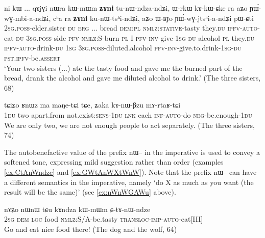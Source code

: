 \documentclass[oldfontcommands,oneside,a4paper,11pt]{article}
\newcommand{\ipa}[1]{{\phon \mbox{#1}}} %
\begin{document}
   \begin{exe}
\ex \label{ex:tunWndzandZi}
\gll  \ipa{nɤ-pi}   	\ipa{ni}   	\ipa{kɯ}   	...   	\ipa{qɤjɣi}   	\ipa{nɯra}   	\ipa{kɯ-mɯm}   	\textbf{\ipa{ʑɤni}}   	\ipa{tu-nɯ-ndza-ndʑi,}   	\ipa{ɯ-rkɯ}   	\ipa{kɤ-kɯ-ɕke}   	\ipa{ra}   	\ipa{aʑo}   	\ipa{ɲɯ́-wɣ-mbi-a-ndʑi,}   	\ipa{cʰa}   	\ipa{ra}   	\textbf{\ipa{ʑɤni}}   	\ipa{ku-nɯ-tsʰi-ndʑi,}   	\ipa{aʑo}   	\ipa{ɯ-ʁɟo}   	\ipa{ɲɯ́-wɣ-jtsʰi-a-ndʑi}   	\ipa{pɯ-ɕti}        \\
\textsc{2sg.poss}-elder.sister \textsc{du} \textsc{erg} ... bread \textsc{dem:pl} \textsc{nmlz:stative}-tasty they.\textsc{du} \textsc{ipfv}-\textsc{auto}-eat-\textsc{du} \textsc{3sg.poss}-side \textsc{pfv}-\textsc{nmlz:S}-burn \textsc{pl}  I \textsc{pfv}-\textsc{inv}-give-\textsc{1sg}-\textsc{du} alcohol \textsc{pl} they.\textsc{du} \textsc{ipfv}-\textsc{auto}-drink-\textsc{du} \textsc{1sg} \textsc{3sg.poss}-diluted.alcohol \textsc{pfv}-\textsc{inv}-give.to.drink-\textsc{1sg}-\textsc{du} \textsc{pst.ipfv}-be.\textsc{assert}  \\
 \glt    `Your two sisters (...) ate the tasty food and gave me the burned part of the bread, drank the alcohol and gave me diluted alcohol to drink.'  (The three sisters, 68)
\end{exe} 



   \begin{exe}
\ex \label{ex:kAnWBzu.mArtaRtCi}
\gll
\ipa{tɕiʑo} 	\ipa{ʁnɯz} 	\ipa{ma} 	\ipa{maŋe-tɕi} 	\ipa{tɕe,} 	\ipa{ʑaka} 	\ipa{kɤ-nɯ-βzu} 	\ipa{mɤ-rtaʁ-tɕi} \\
\textsc{1du} two apart.from not.exist:\textsc{sens}-\textsc{1du} \textsc{lnk} each \textsc{inf-auto}-do \textsc{neg}-be.enough-\textsc{1du} \\
\glt We are only two, we are not enough people to act separately. (The three sisters, 74)
\end{exe} 

The autobenefactive value of the prefix \ipa{nɯ--}  in the imperative is used to convey a softened tone, expressing mild suggestion rather than order (examples \ref{ex:CtAnWndze} and \ref{ex:GWtAnWXtWnW}). Note that the prefix \ipa{nɯ--}  can have a different semantics in the imperative, namely `do X as much as you want (the result will be the same)' (see  \ref{ex:nWnWGAWu} above).

\begin{exe}
\ex \label{ex:CtAnWndze}
\gll
\ipa{nɤʑo} 	\ipa{nɯnɯ} \ipa{tɕu} 	\ipa{kɤndza} 	\ipa{kɯ-mɯm} 	\ipa{ɕ-tɤ-nɯ-ndze} \\
\textsc{2sg} \textsc{dem} \textsc{loc} food \textsc{nmlz}:S/A-be.tasty \textsc{transloc-imp-auto}-eat[III] \\
\glt Go and eat nice food there! (The dog and the wolf, 64)
\end{exe}
\end{document}
